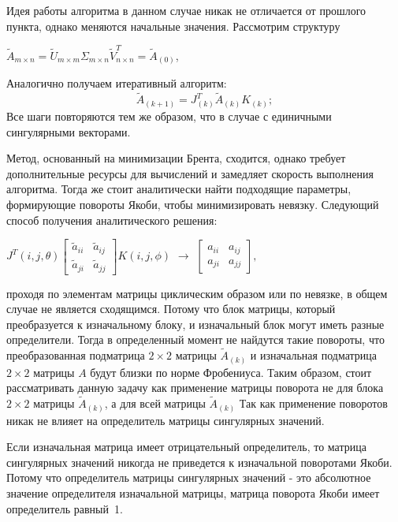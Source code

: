 
Идея работы алгоритма в данном случае никак не отличается от прошлого пункта, однако меняются начальные значения. Рассмотрим структуру 
\begin{center}
    $\tilde{A}_{m \times n} = \tilde{U}_{m\times m}\Sigma_{m\times n}\tilde{V}^T_{n \times n} = \tilde{A}_{(0)}$,
\end{center}
Аналогично получаем итеративный алгоритм:
\begin{equation}
    \tilde{A}_{(k+1)}= J^T_{(k)}\tilde{A}_{(k)}K_{(k)};
\end{equation}
Все шаги повторяются тем же образом, что в случае с единичными сингулярными векторами.


\newpage
{}

Метод, основанный на минимизации Брента, сходится, однако требует дополнительные ресурсы для вычислений и замедляет скорость выполнения алгоритма. Тогда же стоит аналитически найти подходящие параметры, формирующие повороты Якоби, чтобы минимизировать невязку. 
Следующий способ получения аналитического решения: \begin{center}
$J^T(i, j, \theta)\begin{bmatrix}
    \tilde{a}_{ii}&\tilde{a}_{ij}\\
    \tilde{a}_{ji}&\tilde{a}_{jj}
\end{bmatrix}K(i,j,\phi)$ $\to $
$\begin{bmatrix}
    a_{ii}&a_{ij}\\
    a_{ji}&a_{jj}
\end{bmatrix},$ 
\end{center}
проходя по элементам матрицы циклическим образом или по невязке, в общем случае не является сходящимся. Потому что блок матрицы, который преобразуется к изначальному блоку, и изначальный блок могут иметь разные определители. 
Тогда в определенный момент не найдутся такие повороты, что преобразованная подматрица $2\times 2$ матрицы $\tilde{A}_{(k)}$ и изначальная подматрица $2\times2$ матрицы $A$ будут близки по норме Фробениуса. Таким образом, стоит рассматривать данную задачу как применение матрицы поворота не для блока $2\times2$ матрицы $\tilde{A}_{(k)}$, а для всей матрицы $\tilde{A}_{(k)}$
Так как применение поворотов никак не влияет на определитель матрицы сингулярных значений. 
\begin{note}
Если изначальная матрица имеет отрицательный определитель, то матрица сингулярных значений никогда не приведется к изначальной поворотами Якоби. Потому что определитель матрицы сингулярных значений - это абсолютное значение определителя изначальной матрицы, матрица поворота Якоби имеет определитель равный~1.
\end{note}


